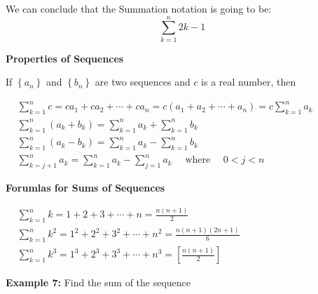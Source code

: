 \documentclass{report}
\begin{document}
\begin{center}
  
 We can conclude that the Summation notation is going to be:
$$\sum_{k=1}^n 2 k-1$$
\end{center}
\bigbreak \noindent \bigbreak \noindent \bigbreak \noindent
\begin{mdframed}
  
\begin{LARGE}
 \begin{center}
	 \textbf{Properties of Sequences} 
 \end{center} 
\end{LARGE}
\vspace{4mm}

\noindent \begin{large}
  If $\left\{a_n\right\}$ and $\left\{b_n\right\}$ are two sequences and $c$ is a real number, then
\end{large}
\bigbreak \noindent 

$\begin{aligned} & \sum_{k=1}^n c=c a_1+c a_2+\cdots+c a_n=c\left(a_1+a_2+\cdots+a_n\right)=c \sum_{k=1}^n a_k \\ & \sum_{k=1}^n\left(a_k+b_k\right)=\sum_{k=1}^n a_k+\sum_{k=1}^n b_k \\ & \sum_{k=1}^n\left(a_k-b_k\right)=\sum_{k=1}^n a_k-\sum_{k=1}^n b_k \\ & \sum_{k=j+1}^n a_k=\sum_{k=1}^n a_k-\sum_{j=1}^n a_k \quad \text { where } \quad 0<j<n\end{aligned}$
\end{mdframed}
\bigbreak \noindent \bigbreak \noindent 
\begin{mdframed}
 \begin{center}
	 \textbf{Forumlas for Sums of Sequences} 
 \end{center} 
 \vspace{4mm}

$\begin{aligned} & \sum_{k=1}^n k=1+2+3+\cdots+n=\frac{n(n+1)}{2} \\ & \sum_{k=1}^n k^2=1^2+2^2+3^2+\cdots+n^2=\frac{n(n+1)(2 n+1)}{6} \\ & \sum_{k=1}^n k^3=1^3+2^3+3^3+\cdots+n^3=\left[\frac{n(n+1)}{2}\right]\end{aligned}$
\vspace{2mm}
\end{mdframed}
\bigbreak \noindent \bigbreak \noindent
\begin{large}
 \begin{center}
	 \textbf{Example 7:} 
	 Find the sum of the sequence
 \end{center} 
\end{large}
\end{document}
